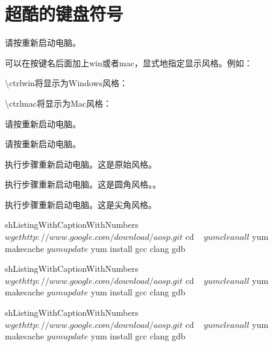 \clearpage
\section{超酷的键盘符号}

请按\Keys{\ctrl + \Alt + \del + \cmd + \enter + \shift + \return + \SPACE}重新启动电脑。

可以在按键名后面加上win或者mac，显式地指定显示风格。例如：

\textbackslash{}ctrlwin将显示为Windows风格：\Keys{\ctrlwin}

\textbackslash{}ctrlmac将显示为Mac风格：\Keys{\ctrlmac}

请按重新启动电脑。

请按\ShadowedKeys{\ctrl + \Alt + \del + \cmd + \enter + \shift + \return + \SPACE}重新启动电脑。

执行步骤重新启动电脑。这是原始风格。

执行步骤重新启动电脑。这是圆角风格。。

执行步骤重新启动电脑。这是尖角风格。

\begin{ListingWithCaptionWithNumbers}{sh}{ListingWithCaptionWithNumbers}
$ wget http://www.google.com/download/aosp.git
$ cd ~
$ yum clean all
$ yum makecache
$ yum update
$ yum install gcc clang gdb
\end{ListingWithCaptionWithNumbers}

\begin{ListingWithCaptionWithNumbers}{sh}{ListingWithCaptionWithNumbers}
$ wget http://www.google.com/download/aosp.git
$ cd ~
$ yum clean all
$ yum makecache
$ yum update
$ yum install gcc clang gdb
\end{ListingWithCaptionWithNumbers}

\begin{ListingWithCaptionWithNumbers}{sh}{ListingWithCaptionWithNumbers}
$ wget http://www.google.com/download/aosp.git
$ cd ~
$ yum clean all
$ yum makecache
$ yum update
$ yum install gcc clang gdb
\end{ListingWithCaptionWithNumbers}